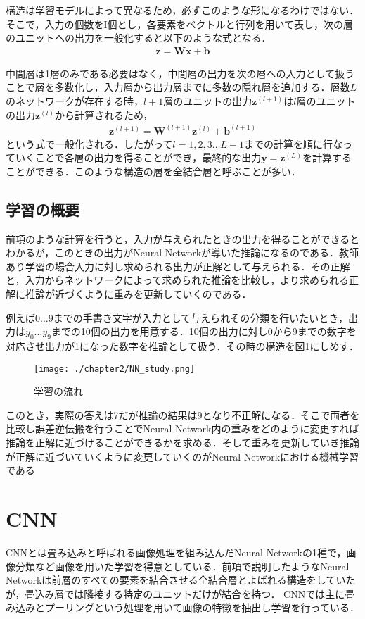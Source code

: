 構造は学習モデルによって異なるため，必ずこのような形になるわけではない．そこで，入力の個数をI個とし，各要素をベクトルと行列を用いて表し，次の層のユニットへの出力を一般化すると以下のような式となる．
\begin{align*}
\bm{z} = \bm{W}\bm{x} + \bm{b}
\end{align*}

中間層は1層のみである必要はなく，中間層の出力を次の層への入力として扱うことで層を多数化し，入力層から出力層までに多数の隠れ層を追加する．層数$L$のネットワークが存在する時，$l+1$層のユニットの出力$\bm{z}^{(l+1)}$は$l$層のユニットの出力$\bm{z}^{(l)}$から計算されるため，
\begin{align*}
\bm{z}^{(l+1)} = \bm{W}^{(l+1)}\bm{z}^{(l)} + \bm{b}^{(l+1)}
\end{align*}
という式で一般化される．したがって$l=1,2,3\ldots L-1$までの計算を順に行なっていくことで各層の出力を得ることができ，最終的な出力$\bm{y}=\bm{z}^{(L)}$を計算することができる．このような構造の層を全結合層と呼ぶことが多い．

\subsection{学習の概要}
前項のような計算を行うと，入力が与えられたときの出力を得ることができるとわかるが，このときの出力がNeural Networkが導いた推論になるのである．教師あり学習の場合入力に対し求められる出力が正解として与えられる．その正解と，入力からネットワークによって求められた推論を比較し，より求められる正解に推論が近づくように重みを更新していくのである．

例えば$0 \ldots 9$までの手書き文字が入力として与えられその分類を行いたいとき，出力は$y_0 \ldots y_9$までの10個の出力を用意する．10個の出力に対し0から9までの数字を対応させ出力が1になった数字を推論として扱う．その時の構造を図\ref{fig_study}にしめす．
\begin{figure}[]
  \begin{center}
    \texttt{[image: ./chapter2/NN\_study.png]}
    \caption{学習の流れ}
    \label{fig_study}
  \end{center}
\end{figure}

このとき，実際の答えは7だが推論の結果は9となり不正解になる．そこで両者を比較し誤差逆伝搬を行うことでNeural Network内の重みをどのように変更すれば推論を正解に近づけることができるかを求める．そして重みを更新していき推論が正解に近づいていくように変更していくのがNeural Networkにおける機械学習である

\section{CNN}
CNNとは畳み込みと呼ばれる画像処理を組み込んだNeural Networkの1種で，画像分類など画像を用いた学習を得意としている．前項で説明したようなNeural Networkは前層のすべての要素を結合させる全結合層とよばれる構造をしていたが，畳込み層では隣接する特定のユニットだけが結合を持つ．
CNNでは主に畳み込みとプーリングという処理を用いて画像の特徴を抽出し学習を行っている．

